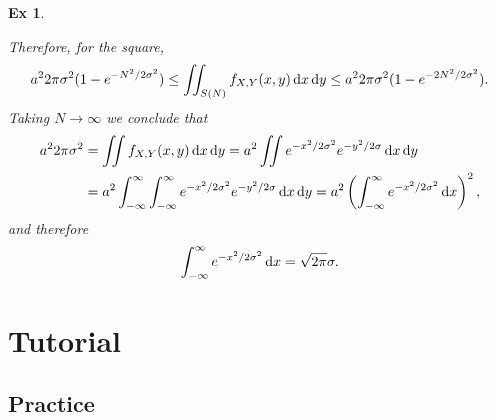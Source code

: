\documentclass[a4paper,11pt]{article}
\newtheorem{exercise}[theorem]{Ex}
\begin{document}
\begin{exercise}
\begin{solution}
Therefore, for the square,
\begin{equation}
a^{2}2\pi{\sigma^{2}} (1-e^{-N^{2}/2\sigma^{2}}) \leq
  \iint_{S(N)}f_{X,Y}(x,y) \,\textrm{d}x\,\textrm{d}y \leq
a^{2}2\pi{\sigma^{2}} (1-e^{-2N^{2}/2\sigma^{2}}).
\end{equation}
Taking $N\to\infty$ we conclude that
\begin{align}
a^{2}2\pi{\sigma^{2}}
&=\iint f_{X,Y}(x,y) \,\textrm{d}x\,\textrm{d}y
=a^{2}  \iint e^{-x^{2}/2\sigma^{2}} e^{-y^{2}/2\sigma} \,\textrm{d}x\,\textrm{d}y\\
&=a^{2}  \int_{-\infty}^{\infty} \int_{-\infty}^{\infty }e^{-x^{2}/2\sigma^{2}} e^{-y^{2}/2\sigma} \,\textrm{d}x\,\textrm{d}y
=a^{2} \left( \int_{-\infty}^{\infty }e^{-x^{2}/2\sigma^{2}} \,\textrm{d}x\right)^{2},
\end{align}
and therefore
\begin{equation}
\label{eq:0518}
\int_{-\infty}^{\infty }e^{-x^{2}/2\sigma^{2}} \,\textrm{d}x = \sqrt{2 \pi}\sigma.
\end{equation}
\end{solution}
\end{exercise}


\section{Tutorial}
\label{sec:tutorial}


\subsection{Practice}
\end{document}
